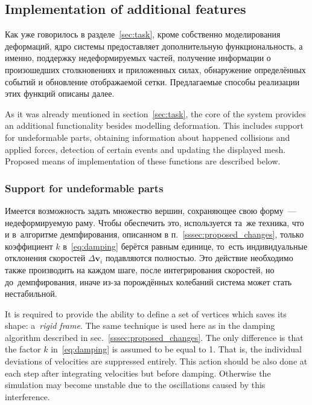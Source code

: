 \documentclass[a4paper, 12pt, titlepage]{extarticle}
\newcommand{\vect}[1]{\mathbf{#1}} %
\begin{document}
    \subsection{Implementation of additional features}

\begin{original}
      Как уже говорилось в разделе~\ref{sec:task}, кроме собственно моделирования деформаций, ядро
      системы предоставляет дополнительную функциональность, а именно, поддержку недеформируемых
      частей, получение информации о произошедших столкновениях и приложенных силах, обнаружение
      определённых событий и обновление отображаемой сетки. Предлагаемые способы
      реализации этих функций описаны далее.
\end{original}

      As it was already mentioned in section~\ref{sec:task}, the core of the system provides
      an additional functionality besides modelling deformation. This includes support for
      undeformable parts, obtaining information about happened collisions and applied forces,
      detection of certain events and updating the displayed mesh. Proposed means of implementation
      of these functions are described below.

      \subsubsection{Support for undeformable parts}

\begin{original}
        Имеется возможность задать множество вершин, сохраняющее свою форму~--- недеформируемую раму.
        Чтобы обеспечить это, используется та~же техника, что и в~алгоритме демпфирования,
        описанном в п.~\ref{sssec:proposed_changes}, только коэффициент $k$ в~\eqref{eq:damping}
        берётся равным единице, то~есть индивидуальные отклонения скоростей $\Delta \vect{v}_i$
        подавляются полностью. Это действие необходимо также производить на каждом шаге, после
        интегрирования скоростей, но до~демпфирования, иначе из-за порождённых колебаний система
        может стать нестабильной.
\end{original}

        It is required to provide the ability to define a set of vertices which saves its shape:
        a~\emph{rigid frame}. The same technique is used here as in the damping algorithm described
        in sec.~\ref{sssec:proposed_changes}. The only difference is that the factor $k$
        in~\eqref{eq:damping} is assumed to be equal to 1. That is, the individual deviations of
        velocities are suppressed entirely. This action should be also done at each step after
        integrating velocities but before damping. Otherwise the simulation may become unstable due
        to the oscillations caused by this interference.
\end{document}

